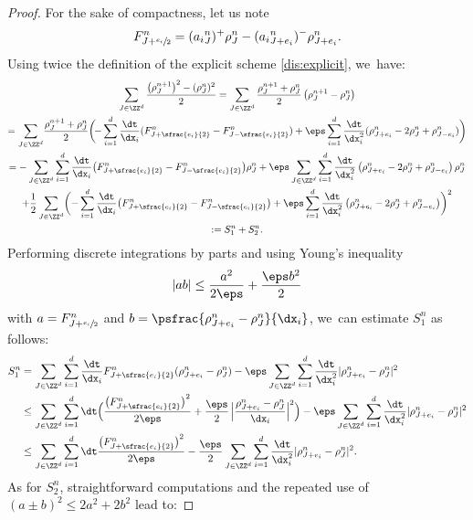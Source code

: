\begin{proof}
For the sake of compactness, let us note
\[
F_{J+ \sfrac{e_i}{2}}^n = ({a_i}^n_{J})^+ \rho_{J}^n - ({a_i}^n_{J+e_i})^- \rho_{J+e_i}^n.
\]
Using twice the definition of the explicit scheme \eqref{dis:explicit}, we~have:
\begin{multline*}
\sum_{J \in \ZZ^d} \frac{\big(\rho_J^{n+1}\big)^2 -(\rho_J^n)^2}{2} = \sum_{J \in \ZZ^d} \frac{\rho_J^{n+1}+ \rho_J^n}{2} \left(\rho_J^{n+1}-\rho_J^n\right) \\
= \sum_{J \in \ZZ^d}\! \frac{\rho_J^{n+1} + \rho_J^n}{2} \biggl(\!- \sum_{i=1}^{d} \frac{\dt}{\dx_i}
(F_{J+ \sfrac{e_i}{2}}^n - F_{J- \sfrac{e_i}{2}}^n)+ \eps \sum_{i=1}^{d} \frac{\dt}{\dx_i^2}(\rho_{J+e_i}^n - 2\rho_J^n + \rho_{J-e_i}^n)\biggr) \\
= - \sum_{J \in \ZZ^d} \sum_{i=1}^{d} \frac{\dt}{\dx_i}
\big(F_{J+ \sfrac{e_i}{2}}^n - F_{J- \sfrac{e_i}{2}}^n \big) \rho_J^n + \eps \sum_{J \in \ZZ^d} \sum_{i=1}^{d} \frac{\dt}{\dx_i^2} \left(\rho_{J+e_i}^n - 2\rho_J^n + \rho_{J-e_i}^n \right)\rho_J^n \\
+ \frac 12 \sum_{J \in \ZZ^d} \biggl(- \sum_{i=1}^{d} \frac{\dt}{\dx_i}
\big(F_{J+ \sfrac{e_i}{2}}^n - F_{J- \sfrac{e_i}{2}}^n \big) + \eps \sum_{i=1}^{d} \frac{\dt}{\dx_i^2} \left(\rho_{J+e_i}^n - 2\rho_J^n + \rho_{J-e_i}^n \right)\biggr)^2\\
:= S_1^n + S_2^n.
\end{multline*}
Performing discrete integrations by parts and using Young's inequality
\[
|ab| \leq \frac{a^2}{2\eps} + \frac{\eps b^2}{2}
\]
with $a=F_{J+ \sfrac{e_i}{2}}^n$ and $b=\psfrac{\rho_{J+e_i}^n - \rho_J^n}{\dx_i}$, we~can estimate $S_1^n$ as follows:
\begin{align*}
S_1^n & = \sum_{J \in \ZZ^d} \sum_{i=1}^{d} \frac{\dt}{\dx_i}
F_{J+ \sfrac{e_i}{2}}^n(\rho_{J+e_i}^n - \rho_J^n) - \eps \sum_{J \in \ZZ^d} \sum_{i=1}^{d} \frac{\dt}{\dx_i^2} |\rho_{J+e_i}^n - \rho_J^n|^2 \\
& \leq \sum_{J \in \ZZ^d} \sum_{i=1}^{d} \dt \Bigl(
\frac{\big(F_{J+ \sfrac{e_i}{2}}^n\big)^2}{2\eps} + \frac{\eps}{2}\,\Bigl|\frac{\rho_{J+e_i}^n - \rho_J^n}{\dx_i}\Bigr|^2 \Bigr) - \eps \sum_{J \in \ZZ^d} \sum_{i=1}^{d} \frac{\dt}{\dx_i^2} |\rho_{J+e_i}^n - \rho_J^n|^2 \\
& \leq \sum_{J \in \ZZ^d} \sum_{i=1}^{d} \dt
\frac{\big(F_{J+ \sfrac{e_i}{2}}^n\big)^2}{2\eps} - \frac{\eps}{2} \sum_{J \in \ZZ^d} \sum_{i=1}^{d} \frac{\dt}{\dx_i^2} |\rho_{J+e_i}^n - \rho_J^n|^2.
\end{align*}
As for $S_2^n$, straightforward computations and the repeated use of $(a\pm b)^2 \leq 2a^2+2b^2$ lead to:

\end{proof}

